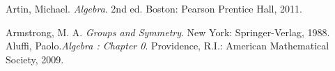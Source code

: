 \documentclass[12pt]{amsart}
\theoremstyle{definition}
\theoremstyle{remark}
\numberwithin{equation}{section}
\begin{document}

\begin{thebibliography}{10}

	  Artin, Michael. {\it Algebra}. 2nd ed. Boston: Pearson Prentice Hall, 2011.
	
	
	
	 Armstrong, M. A. {\it Groups and Symmetry}. New York: Springer-Verlag, 1988.
	 Aluffi, Paolo.{\it Algebra : Chapter 0}. Providence, R.I.: American Mathematical Society, 2009.
	
	
	
	
\end{thebibliography}
\end{document}
